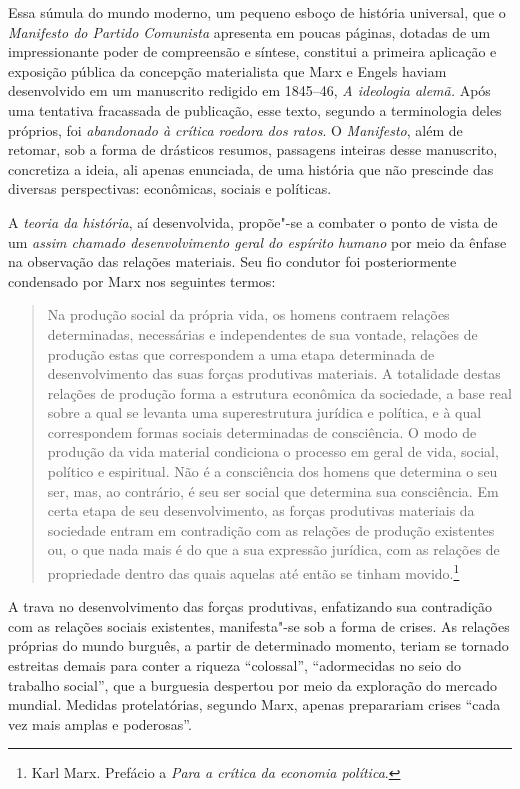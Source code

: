 Essa súmula do mundo moderno, um pequeno esboço de história universal,
que o \textit{Manifesto do Partido Comunista} apresenta em poucas
páginas, dotadas de um impressionante poder de compreensão e síntese,
constitui a primeira aplicação e exposição pública da concepção
materialista que Marx e Engels haviam desenvolvido em um manuscrito
redigido em 1845--46, \textit{A ideologia alemã.} Após uma tentativa
fracassada de publicação, esse texto, segundo a terminologia deles
próprios, foi \textit{abandonado à crítica roedora dos ratos}. O
\textit{Manifesto}, além de retomar, sob a forma de drásticos resumos,
passagens inteiras desse manuscrito, concretiza a ideia, ali apenas
enunciada, de uma história que não prescinde das diversas perspectivas:
econômicas, sociais e políticas.

A \textit{teoria da história}, aí desenvolvida, propõe"-se a combater o ponto
de vista de um \textit{assim chamado desenvolvimento geral do espírito humano}
por meio da ênfase na observação das relações materiais. Seu fio
condutor foi posteriormente condensado por Marx nos seguintes termos: 

\begin{quote} 
Na produção social da própria vida, os homens contraem relações
determinadas, necessárias e independentes de sua vontade, relações de
produção estas que correspondem a uma etapa determinada de
desenvolvimento das suas forças produtivas materiais. A totalidade
destas relações de produção forma a estrutura econômica da sociedade, a
base real sobre a qual se levanta uma superestrutura jurídica e
política, e à qual correspondem formas sociais determinadas de
consciência. O modo de produção da vida material condiciona o processo
em geral de vida, social, político e espiritual. Não é a consciência
dos homens que determina o seu ser, mas, ao contrário, é seu ser social
que determina sua consciência. Em certa etapa de seu desenvolvimento,
as forças produtivas materiais da sociedade entram em contradição com
as relações de produção existentes  ou, o que nada mais é do que a sua
expressão jurídica, com as relações de propriedade dentro das quais
aquelas até então se tinham movido.\footnote{Karl Marx. Prefácio a
\textit{Para a crítica da economia política}.}
\end{quote} 

A trava no desenvolvimento das forças produtivas, enfatizando sua
contradição com as relações sociais existentes, manifesta"-se sob a
forma de crises. As relações próprias do mundo burguês, a partir de
determinado momento, teriam se tornado estreitas demais para
conter a riqueza ``colossal'', ``adormecidas no seio do trabalho social'',
que a burguesia despertou por meio da exploração do mercado mundial.
Medidas protelatórias, segundo Marx, apenas preparariam crises ``cada
vez mais amplas e poderosas''.

